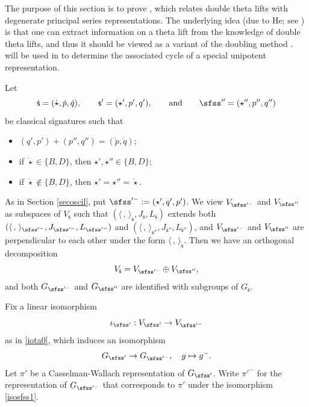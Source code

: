 \documentclass[11pt,a4paper]{amsart}
\newcommand{\la}{\langle}
\newcommand{\ra}{\rangle}
\newcommand{\be}{\begin {equation}}
\newcommand{\ee}{\end {equation}}
\numberwithin{equation}{section}
\theoremstyle{remark}
\begin{document}
\def\GLE{\GL(\bfE)^{J_{\bfU}}}
\def\GLEz{\GL_{\bfE_0}}
\def\GLE{{\GL_{\bfE}}}
\def\wtGLE{\widetilde{\GLE}}
\def\wtGLEz{\widetilde{\GLEz}}
\def\wtPE{\widetilde{P_\bfE}}
\def\JU{{J_{\bfU}}}
\def\LU{{L_{\bfU}}}
\def\wtGU{\widetilde{G}_\bfU}
\def\dsfss{{\dot{\mathsf s}}}


The purpose of this section is to prove , which relates double theta lifts with degenerate principal series representations. The underlying idea (due to He; see \cite[Chapter 4]{He}) is that one can extract information on a theta lift from the knowledge of double theta lifts, and thus it should be viewed as a variant of the doubling method \cite[Section II]{Ra}.   will be used in  to determine the associated cycle of a special unipotent representation.

Let
\[
\dot{ \mathsf s}=(\dot \star, \dot p,\dot q),\qquad  \mathsf s'=(\star', p',q'),\qquad \textrm{and}\qquad \sfss''=(\star'', p'', q'')
\]
be classical signatures such that
\begin{itemize}
  \item $ (q', p')+(p'', q'')=(\dot p, \dot q)$;\smallskip
  \item if $\dot \star\in \{B,D\}$,  then $\star', \star''\in \{B,D\}$; \smallskip
  \item if $\dot \star\notin \{B,D\}$,  then $\star'=\star''=\dot \star$.
\end{itemize}

As in Section \ref{secoscil}, put $\sfss'^-:=(\star', q', p')$. We view $V_{\sfss'^-}$ and $V_{\sfss''}$ as subspaces of $V_\dsfss$ such that $(\la\,,\,\ra_{\dsfss}, J_{\dsfss},L_{\dsfss})$  extends both $(\la\,,\,\ra_{\sfss'^-}, J_{\sfss'^-}, L_{\sfss'^-})$ and
$(\la\,,\,\ra_{\mathsf s''}, J_{\mathsf s''}, L_{\mathsf s''})$, and $V_{\sfss'^-}$ and $V_{\sfss''}$ are perpendicular to each other under the form $\la\,,\,\ra_{\dsfss}$. Then we have an orthogonal decomposition
\[
  V_\dsfss=V_{\sfss'^-}\oplus V_{\sfss''},
\]
and both $G_{\sfss'^-}$ and $G_{\sfss''}$ are identified with subgroups of $G_{\dsfss}$.

 Fix a linear isomorphism
\be\label{iota1}
 \iota_{\sfss'}:  V_{\sfss'}\rightarrow V_{\sfss'^-}%
\ee
as in \eqref{iota0}, which  induces an isomorphism
\be\label{isosfss1}
 G_{\sfss'}\rightarrow G_{\sfss'^-}, \quad g\mapsto g^-.
\ee
Let $\pi'$ be a Casselman-Wallach representation of $G_{\sfss'}$. Write $\pi'^-$ for the representation of $G_{\sfss'^-}$ that corresponds to $\pi'$ under the isomorphism \eqref{isosfss1}.
\end{document}
